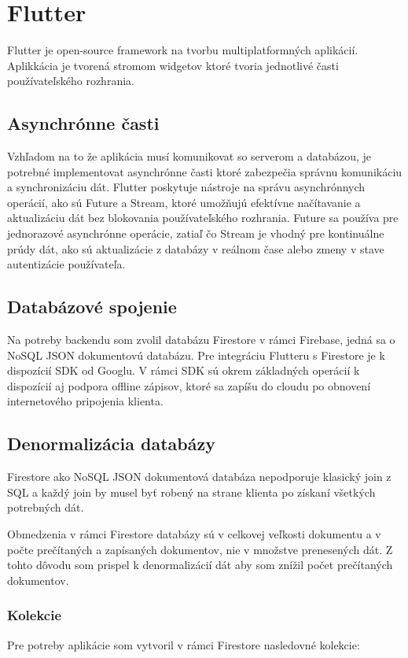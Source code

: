 \section{Flutter}
Flutter je open-source framework na tvorbu multiplatformných aplikácií. Aplikkácia je tvorená stromom widgetov ktoré tvoria jednotlivé časti používateľského rozhrania.

\subsection{Asynchrónne časti}
Vzhľadom na to že aplikácia musí komunikovat so serverom a databázou, je potrebné implementovat asynchrónne časti ktoré zabezpečia správnu komunikáciu a synchronizáciu dát. Flutter poskytuje nástroje na správu asynchrónnych operácií, ako sú Future a Stream, ktoré umožňujú efektívne načítavanie a aktualizáciu dát bez blokovania používateľského rozhrania. Future sa používa pre jednorazové asynchrónne operácie, zatiaľ čo Stream je vhodný pre kontinuálne prúdy dát, ako sú aktualizácie z databázy v reálnom čase alebo zmeny v stave autentizácie používateľa.

\subsection{Databázové spojenie}
Na potreby backendu som zvolil databázu Firestore v rámci Firebase, jedná sa o NoSQL JSON dokumentovú databázu. Pre integráciu Flutteru s Firestore je k dispozícií SDK od Googlu. V rámci SDK sú okrem základných operácií k dispozícií aj podpora offline zápisov, ktoré sa zapíšu do cloudu po obnovení internetového pripojenia klienta.

\subsection{Denormalizácia databázy}
Firestore ako NoSQL JSON dokumentová databáza nepodporuje klasický join z SQL a každý join by musel byť robený na strane klienta po získaní všetkých potrebných dát.

Obmedzenia v rámci Firestore databázy sú v celkovej veľkosti dokumentu a v počte prečítaných a zapísaných dokumentov, nie v množstve prenesených dát. Z tohto dôvodu som prispel k denormalizácií dát aby som znížil počet prečítaných dokumentov.

\subsubsection{Kolekcie}
Pre potreby aplikácie som vytvoril v rámci Firestore nasledovné kolekcie:

